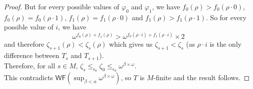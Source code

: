\documentclass{article}
\numberwithin{theorem}{section}
\newcommand{\WF}{\mathsf{WF}}
\begin{document}
\begin{proof}
But for every possible values of $\varphi_0$ and $\varphi_1$, we have $f_0(\rho) > f_0(\rho \cdot 0)$, $f_0(\rho) = f_0(\rho \cdot 1)$, $f_1(\rho) = f_1(\rho \cdot 0)$ and $f_1(\rho) > f_1(\rho \cdot 1)$. So for every possible value of $i$, we have 
$$\omega^{f_0(\rho) + f_1(\rho)} > \omega^{f_0(\rho \cdot i) + f_1(\rho \cdot i)} \times 2$$
and therefore $\zeta_{s+1}(\rho) < \zeta_s(\rho)$ which gives us $\zeta_{s+1} < \zeta_s$ (as $\rho \cdot i$ is the only difference between $T_s$ and $T_{s+1}$). \\

Therefore, for all $s \in M$, $\zeta_s \leq_{\epsilon_0} \zeta_0 \leq_{\epsilon_0} \omega^{\beta \times \omega}$. \\

This contradicts $\WF(\sup_{\beta < \alpha} \omega^{\beta \times \omega})$, so $T$ is $M$-finite and the result follows.
\end{proof}
\end{document}
